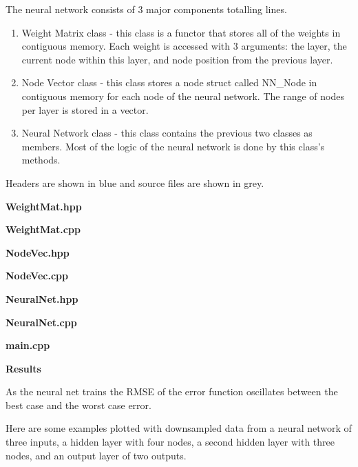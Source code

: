 \documentclass[14pt]{article}
\begin{document}
\begin{flushleft}
The neural network consists of 3 major components totalling lines.
\begin{enumerate}
	\item Weight Matrix class - this class is a functor that stores all of the weights in contiguous memory.
		Each weight is accessed with 3 arguments:
		the layer, the current node within this layer, and node position from the previous layer.
	\item Node Vector class - this class stores a node struct called NN\_Node in contiguous memory
		for each node of the neural network. The range of nodes per layer is stored in a vector.
	\item Neural Network class - this class contains the previous two classes as members.
		Most of the logic of the neural network is done by this class's methods.
\end{enumerate}
Headers are shown in blue and source files are shown in grey.


	\textbf{WeightMat.hpp}

	\textbf{WeightMat.cpp}


	\textbf{NodeVec.hpp}

	\textbf{NodeVec.cpp}


	\textbf{NeuralNet.hpp}

	\textbf{NeuralNet.cpp}


	\textbf{main.cpp}

\newpage
\textbf{Results}

As the neural net trains the RMSE of the error function oscillates between the best case and the worst case error.

Here are some examples plotted with downsampled data from
a neural network of three inputs, a hidden layer with four nodes, a second hidden layer with three nodes,
and an output layer of two outputs.



\end{flushleft}
\end{document}

